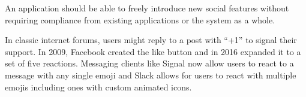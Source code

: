 





\begin{requirement}
\label{requirements:autonomous-extensibility}
    An application should be able to freely introduce new social features without requiring compliance from existing applications or the system as a whole.
\end{requirement}

In classic internet forums, users might reply to a post with ``+1'' to signal their support.
In 2009, Facebook created the like button and in 2016 expanded it to a set of five reactions.
Messaging clients like Signal now allow users to react to a message with any single emoji and
Slack allows for users to react with multiple emojis including ones with custom animated icons.

